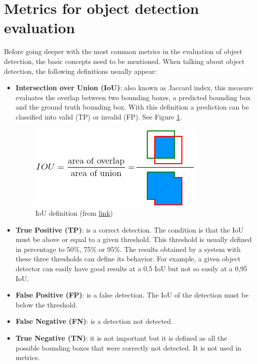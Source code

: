 \section{Metrics for object detection evaluation}
Before going deeper with the most common metrics in the evaluation of object detection, the basic concepts need to be mentioned. When talking about object detection, the following definitions usually appear:
\begin{itemize}
    \item \textbf{Intersection over Union (IoU)}: also known as Jaccard index, this measure evaluates the overlap between two bounding boxes, a predicted bounding box and the ground truth bounding box. With this definition a prediction can be classified into valid (TP) or invalid (FP). See Figure \ref{fig:iou}.
    \begin{figure}[H]
    \begin{center}
    \includegraphics[scale=0.5]{figures/iou.png}
    \caption{IoU definition (from \href{https://github.com/rafaelpadilla/Object-Detection-Metrics#intersection-over-union-iou}{link})}
    \label{fig:iou}
    \end{center}
    \end{figure}
    \item \textbf{True Positive (TP)}: is a correct detection. The condition is that the IoU must be above or equal to a given threshold. This threshold is usually defined in percentage to 50\%, 75\% or 95\%. The results obtained by a system with these three thresholds can define its behavior. For example, a given object detector can easily have good results at a 0,5 IoU but not so easily at a 0,95 IoU.
    \item \textbf{False Positive (FP)}: is a false detection. The IoU of the detection must be below the threshold.
    \item \textbf{False Negative (FN)}: is a detection not detected.
    \item \textbf{True Negative (TN)}: it is not important but it is defined as all the possible bounding boxes that were correctly not detected. It is not used in metrics.
\end{itemize}

